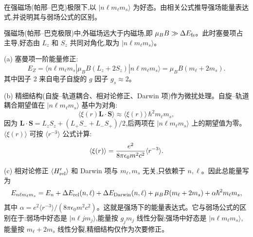 \begin{question}
在强磁场(帕邢--巴克)极限下,以 $|n\ell m_\ell m_s\rangle$ 为好态。由相关公式推导强场能量表达式,并说明其与弱场公式的区别。
\begin{solution}
强磁场(帕邢--巴克极限)中,外磁场远大于内磁场,即 $\mu_B B \gg \Delta E_{\rm fs}$。此时塞曼项占主导,好态由 $L_z$ 和 $S_z$ 共同对角化,取为 $|n\ell m_\ell m_s\rangle$。

(a) 塞曼项一阶能量修正:
\[
E_Z = \langle n\ell m_\ell m_s|\mu_B B(L_z+2S_z)|n\ell m_\ell m_s\rangle
= \mu_B B(m_\ell + 2m_s).
\]
其中因子 2 来自电子自旋的 $g$ 因子 $g_s\approx2$。

(b) 精细结构(自旋--轨道耦合、相对论修正、Darwin 项)作为微扰处理。自旋--轨道耦合期望值在 $|n\ell m_\ell m_s\rangle$ 基中为对角:
\[
\langle \xi(r)\mathbf L\cdot\mathbf S\rangle
\approx \langle \xi(r)\rangle \,\hbar^2 m_\ell m_s,
\]
因为 $\mathbf L\cdot\mathbf S = L_z S_z + (L_+S_-+L_-S_+)/2$,后两项在 $|n\ell m_\ell m_s\rangle$ 上的期望值为零。$\langle\xi(r)\rangle$ 可按 $\langle r^{-3}\rangle$ 公式计算:
\[
\langle \xi(r)\rangle = {e^2\over8\pi\epsilon_0 m^2c^2}\langle r^{-3}\rangle.
\]

(c) 相对论修正 $\langle H_{\rm rel}'\rangle$ 和 Darwin 项与 $m_\ell,m_s$ 无关,只依赖于 $n,\ell$。因此总能量写为
\[
E_{n\ell m_\ell m_s} = E_n + \Delta E_{\rm rel}(n,\ell) + \Delta E_{\rm Darwin}(n,\ell) + \mu_B B(m_\ell+2m_s) + \alpha \hbar^2 m_\ell m_s,
\]
其中 $\alpha = e^2\langle r^{-3}\rangle/(8\pi\epsilon_0 m^2c^2)$。这就是强场下的能量表达式。它与弱场公式的区别在于:弱场中好态是 $|n\ell j m_j\rangle$,能量按 $g_j m_j$ 线性分裂;强场中好态是 $|n\ell m_\ell m_s\rangle$,能量按 $m_\ell+2m_s$ 线性分裂,精细结构仅作为次要修正。
\end{solution}
\end{question}

